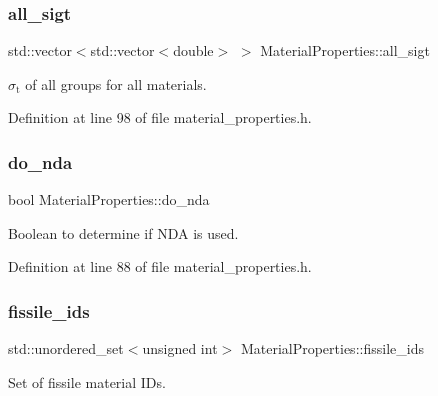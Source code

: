 \subsubsection{\texorpdfstring{all\+\_\+sigt}{all\_sigt}}
{\footnotesize\ttfamily std\+::vector$<$std\+::vector$<$double$>$ $>$ Material\+Properties\+::all\+\_\+sigt\hspace{0.3cm}{\ttfamily [private]}}



$\sigma_\mathrm{t}$ of all groups for all materials. 



Definition at line 98 of file material\+\_\+properties.\+h.

\mbox{\label{class_material_properties_a911d589ba4b11eee87ce5748b760437a}} 
\subsubsection{\texorpdfstring{do\+\_\+nda}{do\_nda}}
{\footnotesize\ttfamily bool Material\+Properties\+::do\+\_\+nda\hspace{0.3cm}{\ttfamily [private]}}



Boolean to determine if N\+DA is used. 



Definition at line 88 of file material\+\_\+properties.\+h.

\mbox{\label{class_material_properties_a43cff88edebbd4e4f2a012c6639e0b89}} 
\subsubsection{\texorpdfstring{fissile\+\_\+ids}{fissile\_ids}}
{\footnotesize\ttfamily std\+::unordered\+\_\+set$<$unsigned int$>$ Material\+Properties\+::fissile\+\_\+ids\hspace{0.3cm}{\ttfamily [private]}}



Set of fissile material I\+Ds. 



